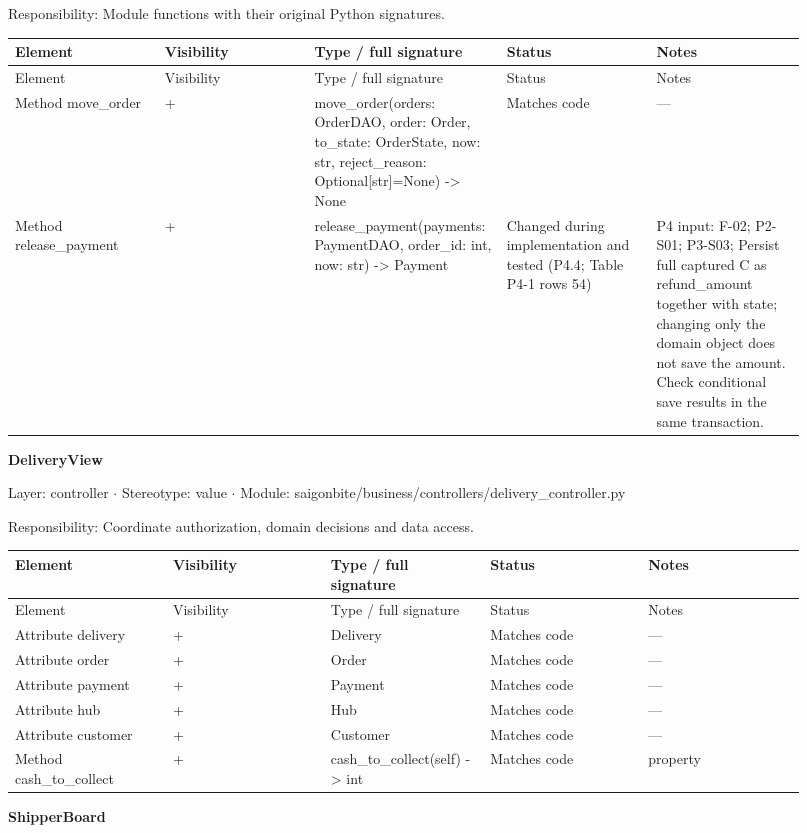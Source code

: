 Responsibility: Module functions with their original Python signatures.

\begin{longtable}{>{\raggedright\arraybackslash}p{0.1840\linewidth}>{\raggedright\arraybackslash}p{0.1840\linewidth}>{\raggedright\arraybackslash}p{0.1840\linewidth}>{\raggedright\arraybackslash}p{0.1840\linewidth}>{\raggedright\arraybackslash}p{0.1840\linewidth}}
Element & Visibility & Type / full signature & Status & Notes \\
\hline\endfirsthead
Element & Visibility & Type / full signature & Status & Notes \\
\hline\endhead
Method move\_order & + & move\_order(orders: OrderDAO, order: Order, to\_state: OrderState, now: str, reject\_reason: Optional[str]=None) -\textgreater{} None & Matches code & --- \\
Method release\_payment & + & release\_payment(payments: PaymentDAO, order\_id: int, now: str) -\textgreater{} Payment & Changed during implementation and tested (P4.4; Table P4-1 rows 54) & P4 input: F-02; P2-S01; P3-S03; Persist full captured C as refund\_amount together with state; changing only the domain object does not save the amount. Check conditional save results in the same transaction. \\
\end{longtable}
\textbf{DeliveryView}

Layer: controller \ensuremath{\cdot} Stereotype: \guillemotleft{}value\guillemotright{} \ensuremath{\cdot} Module: saigonbite/business/controllers/delivery\_controller.py

Responsibility: Coordinate authorization, domain decisions and data access.

\begin{longtable}{>{\raggedright\arraybackslash}p{0.1840\linewidth}>{\raggedright\arraybackslash}p{0.1840\linewidth}>{\raggedright\arraybackslash}p{0.1840\linewidth}>{\raggedright\arraybackslash}p{0.1840\linewidth}>{\raggedright\arraybackslash}p{0.1840\linewidth}}
Element & Visibility & Type / full signature & Status & Notes \\
\hline\endfirsthead
Element & Visibility & Type / full signature & Status & Notes \\
\hline\endhead
Attribute delivery & + & Delivery & Matches code & --- \\
Attribute order & + & Order & Matches code & --- \\
Attribute payment & + & Payment & Matches code & --- \\
Attribute hub & + & Hub & Matches code & --- \\
Attribute customer & + & Customer & Matches code & --- \\
Method cash\_to\_collect & + & cash\_to\_collect(self) -\textgreater{} int & Matches code & property \\
\end{longtable}
\textbf{ShipperBoard}

